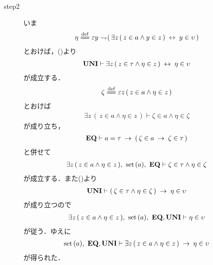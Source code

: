 \begin{sketch}
\begin{description}
			\item[step2]
				いま
				\begin{align}
					\eta \defeq \varepsilon y \negation  (\, \exists z\, (\, z \in a \wedge y \in z\, ) \lrarrow y \in \upsilon\, )
				\end{align}
				とおけば，()より
				\begin{align}
					\mbox{{\bf UNI}} \vdash \exists z\, (\, z \in \tau \wedge \eta \in z\, )
					\hspace{0.25em}\leftrightarrow\hspace{0.25em} \eta \in \upsilon
				\end{align}
				が成立する．
				\begin{align}
					\zeta \defeq \varepsilon z\, (\, z \in a \wedge \eta \in z\, )
				\end{align}
				とおけば
				\begin{align}
					\exists z\, (\, z \in a \wedge \eta \in z\, )
					\vdash \zeta \in a \wedge \eta \in \zeta
				\end{align}
				が成り立ち，
				\begin{align}
					\mbox{{\bf EQ}} \vdash a = \tau \hspace{0.25em}\rightarrow\hspace{0.25em} (\, \zeta \in a \hspace{0.25em}\rightarrow\hspace{0.25em} \zeta \in \tau\, )
				\end{align}
				と併せて
				\begin{align}
					\exists z\, (\, z \in a \wedge \eta \in z\, ),\ \set{a},\ \EQAX
					\vdash \zeta \in \tau \wedge \eta \in \zeta
				\end{align}
				が成立する．また()より
				\begin{align}
					\mbox{{\bf UNI}} \vdash (\, \zeta \in \tau \wedge \eta \in \zeta\, )
					\hspace{0.25em}\rightarrow\hspace{0.25em} \eta \in \upsilon
				\end{align}
				が成り立つので
				\begin{align}
					\exists z\, (\, z \in a \wedge \eta \in z\, ),\ \set{a},\ \EQAX,\UNIAX \vdash \eta \in \upsilon
				\end{align}
				が従う．ゆえに
				\begin{align}
					\operatorname*{set}\hspace{0.15em}(a),\ \mbox{{\bf EQ}},\mbox{{\bf UNI}} \vdash 
					\exists z\, (\, z \in a \wedge \eta \in z\, ) \hspace{0.25em}\rightarrow\hspace{0.25em} \eta \in \upsilon
					\label{fom:union_of_a_set_is_a_set_2}
				\end{align}
				が得られた．
				

\end{description}
\end{sketch}
